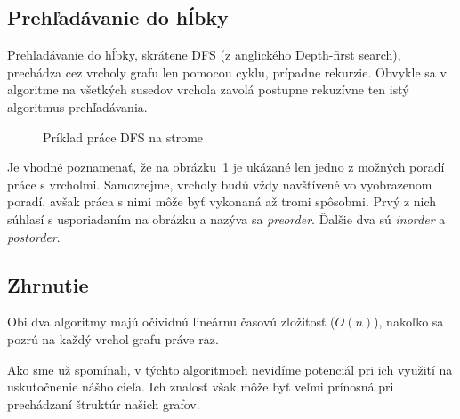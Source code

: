 \subsection{Prehľadávanie do hĺbky}

Prehľadávanie do hĺbky, skrátene DFS (z anglického Depth-first search), prechádza cez vrcholy grafu len pomocou cyklu, prípadne rekurzie. Obvykle sa v algoritme na všetkých susedov vrchola zavolá postupne rekuzívne ten istý algoritmus prehľadávania.\newline

\begin{figure}[H]
  \caption{Príklad práce DFS na strome}
  \label{DFS_priklad}
\end{figure}

Je vhodné poznamenať, že na obrázku~\ref{DFS_priklad} je ukázané len jedno z možných poradí práce s vrcholmi. Samozrejme, vrcholy budú vždy navštívené vo vyobrazenom poradí, avšak práca s nimi môže byť vykonaná až tromi spôsobmi. Prvý z nich súhlasí s usporiadaním na obrázku a nazýva sa \textit{preorder}. Ďalšie dva sú \textit{inorder} a \textit{postorder}.\newline


\subsection{Zhrnutie}

Obi dva algoritmy majú očividnú lineárnu časovú zložitosť ($O(n)$), nakoľko sa pozrú na každý vrchol grafu práve raz.\newline

Ako sme už spomínali, v týchto algoritmoch nevidíme potenciál pri ich využití na uskutočnenie nášho cieľa. Ich znalosť však môže byť veľmi prínosná pri prechádzaní štruktúr našich grafov.\newline


